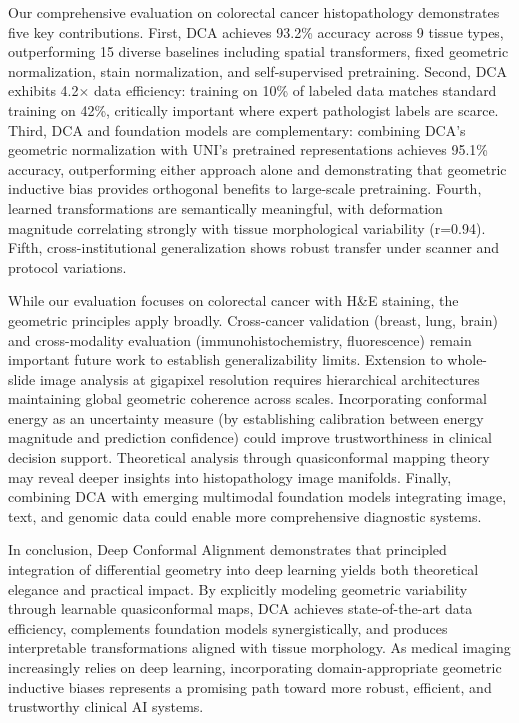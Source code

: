 \documentclass[final,3p,times,review,sort&compress]{elsarticle}
\begin{document}
Our comprehensive evaluation on colorectal cancer histopathology demonstrates five key contributions. First, DCA achieves 93.2\% accuracy across 9 tissue types, outperforming 15 diverse baselines including spatial transformers, fixed geometric normalization, stain normalization, and self-supervised pretraining. Second, DCA exhibits 4.2$\times$ data efficiency: training on 10\% of labeled data matches standard training on 42\%, critically important where expert pathologist labels are scarce. Third, DCA and foundation models are complementary: combining DCA's geometric normalization with UNI's pretrained representations achieves 95.1\% accuracy, outperforming either approach alone and demonstrating that geometric inductive bias provides orthogonal benefits to large-scale pretraining. Fourth, learned transformations are semantically meaningful, with deformation magnitude correlating strongly with tissue morphological variability (r=0.94). Fifth, cross-institutional generalization shows robust transfer under scanner and protocol variations.

While our evaluation focuses on colorectal cancer with H\&E staining, the geometric principles apply broadly. Cross-cancer validation (breast, lung, brain) and cross-modality evaluation (immunohistochemistry, fluorescence) remain important future work to establish generalizability limits. Extension to whole-slide image analysis at gigapixel resolution requires hierarchical architectures maintaining global geometric coherence across scales. Incorporating conformal energy as an uncertainty measure (by establishing calibration between energy magnitude and prediction confidence) could improve trustworthiness in clinical decision support. Theoretical analysis through quasiconformal mapping theory may reveal deeper insights into histopathology image manifolds. Finally, combining DCA with emerging multimodal foundation models integrating image, text, and genomic data could enable more comprehensive diagnostic systems.

In conclusion, Deep Conformal Alignment demonstrates that principled integration of differential geometry into deep learning yields both theoretical elegance and practical impact. By explicitly modeling geometric variability through learnable quasiconformal maps, DCA achieves state-of-the-art data efficiency, complements foundation models synergistically, and produces interpretable transformations aligned with tissue morphology. As medical imaging increasingly relies on deep learning, incorporating domain-appropriate geometric inductive biases represents a promising path toward more robust, efficient, and trustworthy clinical AI systems.
\end{document}
